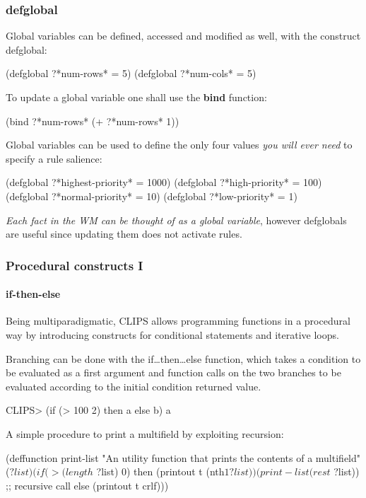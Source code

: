 \documentclass[xcolor={usenames,dvipsnames,svgnames}, compress]{beamer}
\begin{document}
\begin{frame}[fragile]
  \frametitle{defglobal}
  Global variables can be defined, accessed and modified as well, with
  the construct \textsf{defglobal}:
  \begin{clips-code}[numbers=none]
    (defglobal ?*num-rows* = 5)
    (defglobal ?*num-cols* = 5)
  \end{clips-code}

  To update a global variable one shall use the \textbf{bind}
  function:
  \begin{clips-code}[numbers=none]
    (bind ?*num-rows* (+ ?*num-rows* 1))
  \end{clips-code}

  Global variables can be used to define the only four values \emph{you will
  ever need} to specify a rule salience:
  \begin{clips-code}[numbers=none]
    (defglobal ?*highest-priority* = 1000)
    (defglobal ?*high-priority* = 100)
    (defglobal ?*normal-priority* = 10)
    (defglobal ?*low-priority* = 1)
  \end{clips-code}

  \emph{Each fact in the WM can be thought of as a global variable}, however
  \textsf{defglobal}s are useful since updating them does not activate rules.
\end{frame}



\begin{frame}[fragile]
  \frametitle{Procedural constructs I}
  \framesubtitle{if-then-else}
  
  Being multiparadigmatic, CLIPS allows programming functions in a
  procedural way by introducing constructs for conditional statements
  and iterative loops.\par\bigskip
  
  Branching can be done with the \textsf{if\dots then\dots else}
  function, which takes a condition to be evaluated as a first
  argument and function calls on the two branches to be evaluated
  according to the initial condition returned value.
  \begin{clips-code}
    CLIPS> (if (> 100 2) then a else b)
    a
  \end{clips-code}


  A simple procedure to print a multifield by exploiting recursion:
  \begin{clips-code}[numbers=none]
    (deffunction print-list
        "An utility function that prints the contents of a multifield"
        ($?list)
        (if (> (length$ ?list) 0)
            then (printout t (nth$ 1 ?list))
                 (print-list (rest$ ?list)) ;; recursive call
            else (printout t crlf)))
          \end{clips-code}

  
          
\end{frame}
\end{document}
